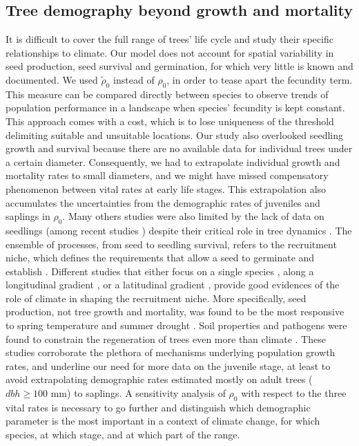 \subsection{Tree demography beyond growth and mortality}
It is difficult to cover the full range of trees' life cycle and study their specific relationships to climate. Our model does not account for spatial variability in seed production, seed survival and germination, for which very little is known and documented. We used $ \tilde \rho_0 $ instead of $ \rho_0 $, in order to tease apart the fecundity term. This measure can be compared directly between species to observe trends of population performance in a landscape when species' fecundity is kept constant. This approach comes with a cost, which is to lose uniqueness of the threshold delimiting suitable and unsuitable locations. Our study also overlooked seedling growth and survival because there are no available data for individual trees under a certain diameter. Consequently, we had to extrapolate individual growth and mortality rates to small diameters, and we might have missed compensatory phenomenon between vital rates at early life stages. This extrapolation also accumulates the uncertainties from the demographic rates of juveniles and saplings in $ \rho_0 $. Many others studies were also limited by the lack of data on seedlings (among recent studies \citet{Kunstler2019, Purves2009, Needham2018, Merow2014}) despite their critical role in tree dynamics \citep{Canham2016}. The ensemble of processes, from seed to seedling survival, refers to the recruitment niche, which defines the requirements that allow a seed to germinate and establish \citep{Valdez2019}. Different studies that either focus on a single species \citep[\textit{Acer saccharum}]{Solarik2016}, along a longitudinal gradient \citep{CLARK2011}, or a latitudinal gradient \citep{Boisvert-Marsh2019}, provide good evidences of the role of climate in shaping the recruitment niche. More specifically, seed production, not tree growth and mortality, was found to be the most responsive to spring temperature and summer drought \citep[11 sites in the Appalachians, Piedmont, and North Carolina]{CLARK2011}. Soil properties and pathogens were found to constrain the regeneration of trees even more than climate \citep[Mont M\'{e}gantic, Qu\'{e}bec]{Brown2014}. These studies corroborate the plethora of mechanisms underlying population growth rates, and underline our need for more data on the juvenile stage, at least to avoid extrapolating demographic rates estimated mostly on adult trees ($ dbh \geqslant 100 $ mm) to saplings. A sensitivity analysis of $ \rho_0 $ with respect to the three vital rates is necessary to go further and distinguish which demographic parameter is the most important in a context of climate change, for which species, at which stage, and at which part of the range. \\

